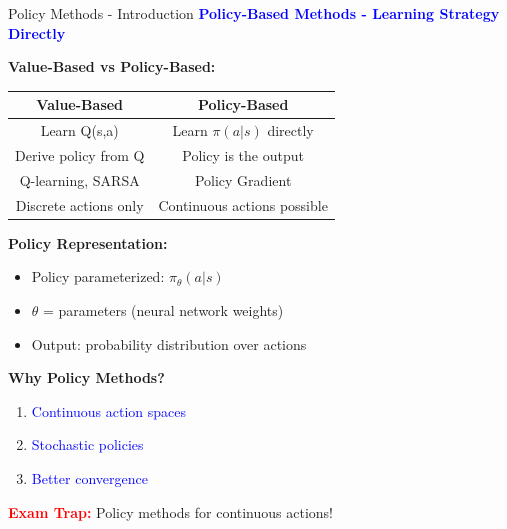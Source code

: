 \documentclass[8pt]{beamer}
\begin{document}
	\begin{frame}{Policy Methods - Introduction}
		\fontsize{6.5}{7.5}\selectfont
		\textcolor{blue}{\textbf{Policy-Based Methods - Learning Strategy Directly}}
		
		\textbf{Value-Based vs Policy-Based:}
		\begin{tabular}{|c|c|}
			\hline
			Value-Based & Policy-Based \\
			\hline
			Learn Q(s,a) & Learn $\pi(a|s)$ directly \\
			\hline
			Derive policy from Q & Policy is the output \\
			\hline
			Q-learning, SARSA & Policy Gradient \\
			\hline
			Discrete actions only & Continuous actions possible \\
			\hline
		\end{tabular}
		
		\textbf{Policy Representation:}
		\begin{itemize}
			\item Policy parameterized: $\pi_\theta(a|s)$
			\item $\theta$ = parameters (neural network weights)
			\item Output: probability distribution over actions
		\end{itemize}
		
		\textbf{Why Policy Methods?}
		\begin{enumerate}
			\item \textcolor{blue}{Continuous action spaces}
			\item \textcolor{blue}{Stochastic policies}
			\item \textcolor{blue}{Better convergence}
		\end{enumerate}
		
		\textcolor{red}{\textbf{Exam Trap:}} Policy methods for continuous actions!
	\end{frame}
	
\end{document}
